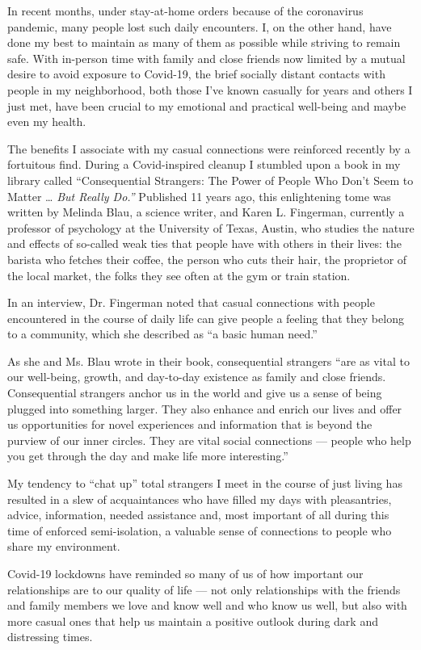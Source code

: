In recent months, under stay-at-home orders because of the coronavirus
pandemic, many people lost such daily encounters. I, on the other hand,
have done my best to maintain as many of them as possible while striving
to remain safe. With in-person time with family and close friends now
limited by a mutual desire to avoid exposure to Covid-19, the brief
socially distant contacts with people in my neighborhood, both those
I've known casually for years and others I just met, have been crucial
to my emotional and practical well-being and maybe even my health.

The benefits I associate with my casual connections were reinforced
recently by a fortuitous find. During a Covid-inspired cleanup I
stumbled upon a book in my library called ``Consequential Strangers: The
Power of People Who Don't Seem to Matter \ldots{} \emph{But Really
Do.''} Published 11 years ago, this enlightening tome was written by
Melinda Blau, a science writer, and Karen L. Fingerman, currently a
professor of psychology at the University of Texas, Austin, who studies
the nature and effects of so-called weak ties that people have with
others in their lives: the barista who fetches their coffee, the person
who cuts their hair, the proprietor of the local market, the folks they
see often at the gym or train station.

In an interview, Dr. Fingerman noted that casual connections with people
encountered in the course of daily life can give people a feeling that
they belong to a community, which she described as ``a basic human
need.''

As she and Ms. Blau wrote in their book, consequential strangers ``are
as vital to our well-being, growth, and day-to-day existence as family
and close friends. Consequential strangers anchor us in the world and
give us a sense of being plugged into something larger. They also
enhance and enrich our lives and offer us opportunities for novel
experiences and information that is beyond the purview of our inner
circles. They are vital social connections --- people who help you get
through the day and make life more interesting.''

My tendency to ``chat up'' total strangers I meet in the course of just
living has resulted in a slew of acquaintances who have filled my days
with pleasantries, advice, information, needed assistance and, most
important of all during this time of enforced semi-isolation, a valuable
sense of connections to people who share my environment.

Covid-19 lockdowns have reminded so many of us of how important our
relationships are to our quality of life --- not only relationships with
the friends and family members we love and know well and who know us
well, but also with more casual ones that help us maintain a positive
outlook during dark and distressing times.

